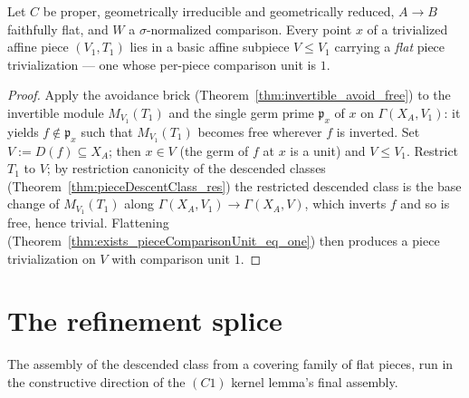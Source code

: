 \begin{theorem}
  \label{thm:exists_flat_pieceTrivialization}
  \leanok
  Let \(C\) be proper, geometrically irreducible and geometrically reduced, \(A \to B\) faithfully
  flat, and \(W\) a \(\sigma\)-normalized comparison. Every point \(x\) of a trivialized affine piece
  \((V_1, T_1)\) lies in a basic affine subpiece \(V \le V_1\) carrying a \emph{flat} piece
  trivialization --- one whose per-piece comparison unit is \(1\).
\end{theorem}
\begin{proof}
  \leanok
  Apply the avoidance brick (Theorem~\ref{thm:invertible_avoid_free}) to the invertible module
  \(M_{V_1}(T_1)\) and the single germ prime \(\mathfrak p_x\) of \(x\) on \(\Gamma(X_A, V_1)\): it
  yields \(f \notin \mathfrak p_x\) such that \(M_{V_1}(T_1)\) becomes free wherever \(f\) is
  inverted. Set \(V := D(f) \subseteq X_A\); then \(x \in V\) (the germ of \(f\) at \(x\) is a unit)
  and \(V \le V_1\). Restrict \(T_1\) to \(V\); by restriction canonicity of the descended classes
  (Theorem~\ref{thm:pieceDescentClass_res}) the restricted descended class is the base change of
  \(M_{V_1}(T_1)\) along \(\Gamma(X_A, V_1) \to \Gamma(X_A, V)\), which inverts \(f\) and so is free,
  hence trivial. Flattening (Theorem~\ref{thm:exists_pieceComparisonUnit_eq_one}) then produces a
  piece trivialization on \(V\) with comparison unit \(1\).
\end{proof}

\section{The refinement splice}
\label{sec:effectivitySplice}

The assembly of the descended class from a covering family of flat pieces, run in the constructive
direction of the \((C1)\) kernel lemma's final assembly.

